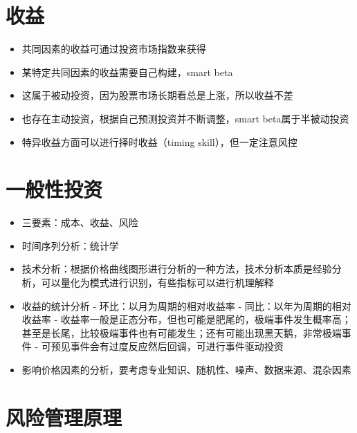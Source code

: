 \documentclass[]{book}
\providecommand{\tightlist}{%
  \setlength{\itemsep}{0pt}\setlength{\parskip}{0pt}}
\begin{document}
\hypertarget{ux6536ux76ca}{%
\section{收益}\label{ux6536ux76ca}}

\begin{itemize}
\tightlist
\item
  共同因素的收益可通过投资市场指数来获得
\item
  某特定共同因素的收益需要自己构建，smart beta
\item
  这属于被动投资，因为股票市场长期看总是上涨，所以收益不差
\item
  也存在主动投资，根据自己预测投资并不断调整，smart beta属于半被动投资
\item
  特异收益方面可以进行择时收益（timing skill），但一定注意风控
\end{itemize}

\hypertarget{ux4e00ux822cux6027ux6295ux8d44}{%
\section{一般性投资}\label{ux4e00ux822cux6027ux6295ux8d44}}

\begin{itemize}
\tightlist
\item
  三要素：成本、收益、风险
\item
  时间序列分析：统计学
\item
  技术分析：根据价格曲线图形进行分析的一种方法，技术分析本质是经验分析，可以量化为模式进行识别，有些指标可以进行机理解释
\item
  收益的统计分析
  - 环比：以月为周期的相对收益率
  - 同比：以年为周期的相对收益率
  - 收益率一般是正态分布，但也可能是肥尾的，极端事件发生概率高；甚至是长尾，比较极端事件也有可能发生；还有可能出现黑天鹅，非常极端事件
  - 可预见事件会有过度反应然后回调，可进行事件驱动投资
\item
  影响价格因素的分析，要考虑专业知识、随机性、噪声、数据来源、混杂因素
\end{itemize}

\hypertarget{ux98ceux9669ux7ba1ux7406ux539fux7406}{%
\section{风险管理原理}\label{ux98ceux9669ux7ba1ux7406ux539fux7406}}
\end{document}
